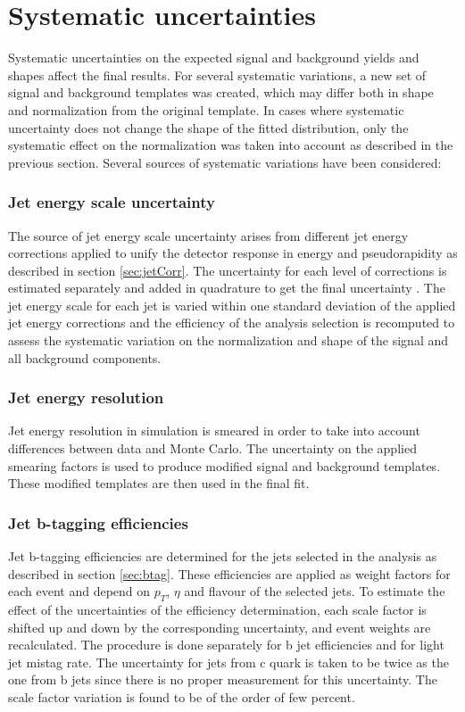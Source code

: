 
\section{Systematic uncertainties}
\label{sec:syst}

Systematic uncertainties on the expected signal and background yields and shapes affect
the final results. For several systematic variations, a new set of signal and background templates was created, which may differ both in shape and normalization from the original template. 
In cases where systematic uncertainty does not change the shape of the fitted distribution, only the systematic effect on the normalization was taken into account as described in the previous section. Several sources of systematic variations have been considered:
\subsubsection*{Jet energy scale uncertainty}
		The source of jet energy scale uncertainty arises from different jet energy corrections applied to unify the detector response in energy and pseudorapidity as described in section \ref{sec:jetCorr}. The uncertainty for each level of corrections is estimated separately and added in quadrature to get the final uncertainty \cite{Chatrchyan:2011ds}. The jet energy scale for each jet is varied within one standard deviation of the applied jet energy corrections and the efficiency of the analysis selection is recomputed to assess the systematic variation on the normalization and shape of the signal and all background components.
\subsubsection*{Jet energy resolution}
        Jet energy resolution in simulation is smeared in order to take into account differences between data and Monte Carlo. The uncertainty on the applied smearing factors is used to produce modified signal and background templates.  These modified templates are then used in the final fit.
\subsubsection*{Jet b-tagging efficiencies}
        Jet b-tagging efficiencies are determined for the jets selected in the analysis as described in section \ref{sec:btag}. These efficiencies are applied as weight factors for each event and depend on $p_T$, $\eta$ and flavour of the selected jets. To estimate the effect of the uncertainties of the efficiency determination, each scale factor is shifted up and down by the corresponding uncertainty, and event weights are recalculated. The procedure is done separately for b jet efficiencies and for light jet mistag rate. The uncertainty for jets from c quark is taken to be twice as the one from b jets since there is no proper measurement for this uncertainty. The scale factor variation is found to be of the order of few percent. 
